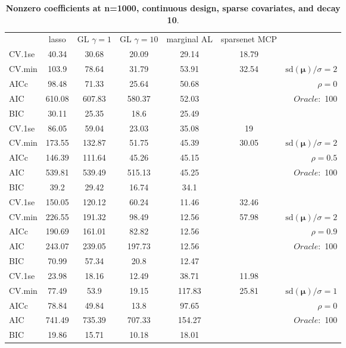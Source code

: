 \clearpage
\begin{table}\vspace{-.5cm}
\caption[l]{ { \bf Nonzero coefficients at n=1000, continuous design, 
sparse covariates, and  decay  10}.}
\vspace{-.5cm}
\footnotesize{}
\begin{center}
\begin{tabular}{l*{5}{c}|r}
& lasso & GL $\gamma=1$ & GL $\gamma=10$ & marginal AL & sparsenet MCP  & \\
 \cline{1-7}
CV.1se & 40.34 & 30.68 & 20.09 & 29.14 & 18.79 & \\
CV.min & 103.9 & 78.64 & 31.79 & 53.91 & 32.54 &  $\mathrm{sd}(\mathbf{\mu})/\sigma=2$ \\
AICc & 98.48 & 71.33 & 25.64 & 50.68 & & $\rho=0$ \\
AIC & 610.08 & 607.83 & 580.37 & 52.03 & &  \multirow{2}{*}{$Oracle: $ 100} \\
BIC & 30.11 & 25.35 & 18.6 & 25.49 & &  \\
 \hline 
CV.1se & 86.05 & 59.04 & 23.03 & 35.08 & 19 & \\
CV.min & 173.55 & 132.87 & 51.75 & 45.39 & 30.05 &  $\mathrm{sd}(\mathbf{\mu})/\sigma=2$ \\
AICc & 146.39 & 111.64 & 45.26 & 45.15 & & $\rho=0.5$ \\
AIC & 539.81 & 539.49 & 515.13 & 45.25 & &  \multirow{2}{*}{$Oracle: $ 100} \\
BIC & 39.2 & 29.42 & 16.74 & 34.1 & &  \\
 \hline 
CV.1se & 150.05 & 120.12 & 60.24 & 11.46 & 32.46 & \\
CV.min & 226.55 & 191.32 & 98.49 & 12.56 & 57.98 &  $\mathrm{sd}(\mathbf{\mu})/\sigma=2$ \\
AICc & 190.69 & 161.01 & 82.82 & 12.56 & & $\rho=0.9$ \\
AIC & 243.07 & 239.05 & 197.73 & 12.56 & &  \multirow{2}{*}{$Oracle: $ 100} \\
BIC & 70.99 & 57.34 & 20.8 & 12.47 & &  \\
 \hline 
CV.1se & 23.98 & 18.16 & 12.49 & 38.71 & 11.98 & \\
CV.min & 77.49 & 53.9 & 19.15 & 117.83 & 25.81 &  $\mathrm{sd}(\mathbf{\mu})/\sigma=1$ \\
AICc & 78.84 & 49.84 & 13.8 & 97.65 & & $\rho=0$ \\
AIC & 741.49 & 735.39 & 707.33 & 154.27 & &  \multirow{2}{*}{$Oracle: $ 100} \\
BIC & 19.86 & 15.71 & 10.18 & 18.01 & &  \\

\end{tabular}
\end{center}
\end{table}
